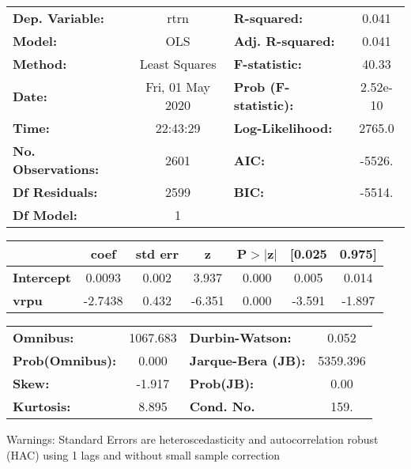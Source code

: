 \begin{center}
\begin{tabular}{lclc}
\toprule
\textbf{Dep. Variable:}    &       rtrn       & \textbf{  R-squared:         } &     0.041   \\
\textbf{Model:}            &       OLS        & \textbf{  Adj. R-squared:    } &     0.041   \\
\textbf{Method:}           &  Least Squares   & \textbf{  F-statistic:       } &     40.33   \\
\textbf{Date:}             & Fri, 01 May 2020 & \textbf{  Prob (F-statistic):} &  2.52e-10   \\
\textbf{Time:}             &     22:43:29     & \textbf{  Log-Likelihood:    } &    2765.0   \\
\textbf{No. Observations:} &        2601      & \textbf{  AIC:               } &    -5526.   \\
\textbf{Df Residuals:}     &        2599      & \textbf{  BIC:               } &    -5514.   \\
\textbf{Df Model:}         &           1      & \textbf{                     } &             \\
\bottomrule
\end{tabular}
\begin{tabular}{lcccccc}
                   & \textbf{coef} & \textbf{std err} & \textbf{z} & \textbf{P$> |$z$|$} & \textbf{[0.025} & \textbf{0.975]}  \\
\midrule
\textbf{Intercept} &       0.0093  &        0.002     &     3.937  &         0.000        &        0.005    &        0.014     \\
\textbf{vrpu}      &      -2.7438  &        0.432     &    -6.351  &         0.000        &       -3.591    &       -1.897     \\
\bottomrule
\end{tabular}
\begin{tabular}{lclc}
\textbf{Omnibus:}       & 1067.683 & \textbf{  Durbin-Watson:     } &    0.052  \\
\textbf{Prob(Omnibus):} &   0.000  & \textbf{  Jarque-Bera (JB):  } & 5359.396  \\
\textbf{Skew:}          &  -1.917  & \textbf{  Prob(JB):          } &     0.00  \\
\textbf{Kurtosis:}      &   8.895  & \textbf{  Cond. No.          } &     159.  \\
\bottomrule
\end{tabular}
\end{center}

Warnings: \newline
 [1] Standard Errors are heteroscedasticity and autocorrelation robust (HAC) using 1 lags and without small sample correction